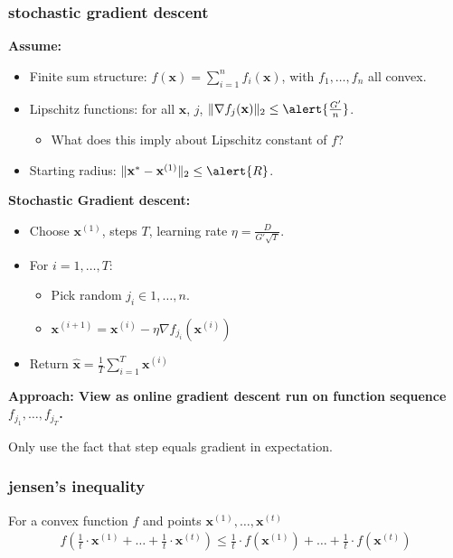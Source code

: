 \documentclass[compress]{beamer}
\newcommand{\bv}[1]{\mathbf{#1}}
\begin{document}
\begin{frame}[t]
	\frametitle{stochastic gradient descent}
	\small
		\vspace{-.5em}
	\textbf{Assume:}
	\vspace{-1em}
	\begin{itemize}
		\item {Finite sum structure:} $f(\bv{x}) = \sum_{i=1}^n f_i(\bv{x})$, with $f_1, \ldots, f_n$ all convex.
		\item {Lipschitz functions}: for all $\bv{x}$, $j$, $\|\nabla f_j(\bv{x})\|_2 \leq \alert{\frac{G'}{n}}$.
		\begin{itemize}
			\item What does this imply about Lipschitz constant of $f$?
		\end{itemize}
		\item Starting radius: $\|\bv{x}^{*} - \bv{x}^{(1)}\|_2 \leq \alert{R}$.
	\end{itemize}
	
	\vspace{-.5em}
	\textbf{Stochastic Gradient descent:}
	\vspace{-1em}
	\begin{itemize}
		\item Choose $\bv{x}^{(1)}$, steps $T$, learning rate $\eta = \frac{D}{G'\sqrt{T}}$.
		\item For $i = 1,\ldots, T$:
		\begin{itemize}
			\item Pick random $j_i \in 1, \ldots, n$.
			\item $\bv{x}^{(i+1)} = \bv{x}^{(i)} - \eta \nabla f_{j_i}(\bv{x}^{(i)})$
		\end{itemize}
		\item Return $\hat{\bv{x}} = \frac{1}{T}\sum_{i=1}^T \bv{x}^{(i)}$
	\end{itemize}
\alert{	\textbf{Approach: View as online gradient descent run on function sequence $f_{j_1}, \ldots, f_{j_T}$.} } 

Only use the fact that step equals gradient in expectation.
\end{frame}


\begin{frame}[t]
	\frametitle{jensen's inequality}
	For a convex function $f$ and points $\bv{x}^{(1)}, \ldots, \bv{x}^{(t)}$
	\begin{align*}
	f\left(\frac{1}{t}\cdot \bv{x}^{(1)} + \ldots + \frac{1}{t}\cdot \bv{x}^{(t)} \right) \leq \frac{1}{t}\cdot f(\bv{x}^{(1)}) + \ldots +\frac{1}{t} \cdot f(\bv{x}^{(t)} )
	\end{align*}
	
\end{frame}
\end{document}
